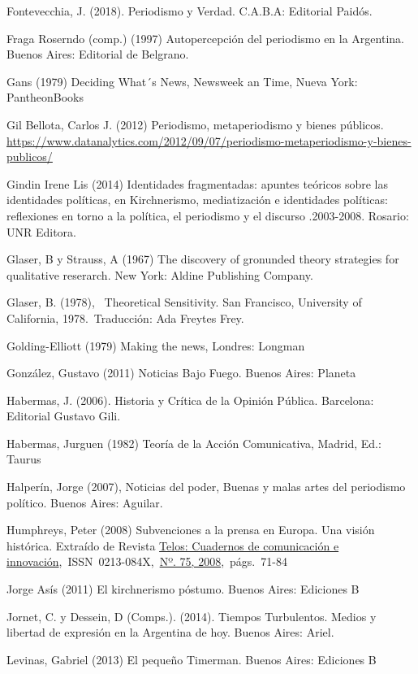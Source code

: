 Fontevecchia, J. (2018). Periodismo y Verdad. C.A.B.A: Editorial Paidós.

Fraga Roserndo (comp.) (1997) Autopercepción del periodismo en la Argentina. Buenos Aires: Editorial de Belgrano.

Gans (1979) Deciding What´s News, Newsweek an Time, Nueva York: PantheonBooks

Gil Bellota, Carlos J. (2012) Periodismo, metaperiodismo y bienes públicos. \url{https://www.datanalytics.com/2012/09/07/periodismo-metaperiodismo-y-bienes-publicos/}

Gindin Irene Lis (2014) Identidades fragmentadas: apuntes teóricos sobre las identidades políticas, en Kirchnerismo, mediatización e identidades políticas: reflexiones en torno a la política, el periodismo y el discurso .2003-2008. Rosario: UNR Editora.

Glaser, B y Strauss, A (1967) The discovery of gronunded theory strategies for qualitative reserarch. New York: Aldine Publishing Company.

Glaser, B. (1978),~ Theoretical Sensitivity. San Francisco, University of California, 1978.~Traducción: Ada Freytes Frey.

Golding-Elliott (1979) Making the news, Londres: Longman

González, Gustavo (2011) Noticias Bajo Fuego. Buenos Aires: Planeta

Habermas, J. (2006). Historia y Crítica de la Opinión Pública. Barcelona: Editorial Gustavo Gili.

Habermas, Jurguen (1982) Teoría de la Acción Comunicativa, Madrid, Ed.: Taurus

Halperín, Jorge (2007), Noticias del poder, Buenas y malas artes del periodismo político. Buenos Aires: Aguilar.

Humphreys, Peter (2008) Subvenciones a la prensa en Europa. Una visión histórica. Extraído de Revista \href{https://dialnet.unirioja.es/servlet/revista?codigo=6769}{Telos: Cuadernos de comunicación e innovación},~ISSN~0213-084X,~\href{https://dialnet.unirioja.es/ejemplar/195612}{Nº. 75, 2008},~págs.~71-84

Jorge Asís (2011) El kirchnerismo póstumo. Buenos Aires: Ediciones B

Jornet, C. y Dessein, D (Comps.). (2014). Tiempos Turbulentos. Medios y libertad de expresión en la Argentina de hoy. Buenos Aires: Ariel.

Levinas, Gabriel (2013) El pequeño Timerman. Buenos Aires: Ediciones B

